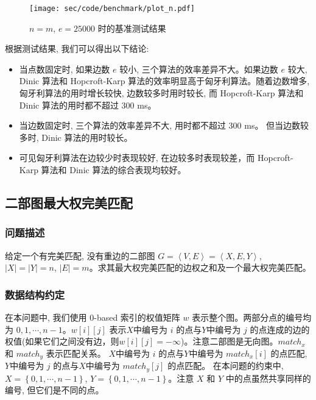 \begin{figure}[H]
	\centering
	\texttt{[image: sec/code/benchmark/plot\_n.pdf]}
	\caption{$n = m$, $e = 25000$ 时的基准测试结果}
	\label{fig:benchmark_n_plot}
\end{figure}

根据测试结果, 我们可以得出以下结论: 
\begin{itemize}
	\item 当点数固定时, 如果边数 $e$ 较小, 三个算法的效率差异不大。如果边数 $e$ 较大, Dinic 算法和 Hopcroft-Karp 算法的效率明显高于匈牙利算法。随着边数增多, 匈牙利算法的用时增长较快, 边数较多时用时较长, 而 Hopcroft-Karp 算法和 Dinic 算法的用时都不超过 300 ms。
	\item 当边数固定时, 三个算法的效率差异不大, 用时都不超过 300 ms。 但当边数较多时, Dinic 算法的用时较长。
	\item 可见匈牙利算法在边较少时表现较好, 在边较多时表现较差，而 Hopcroft-Karp 算法和 Dinic 算法的综合表现均较好。
\end{itemize}

\subsection{二部图最大权完美匹配}
\subsubsection{问题描述}
给定一个有完美匹配, 没有重边的二部图 $G = \left<V, E\right> = \left<X, E, Y\right>$, $\left|X\right| = \left|Y\right| = n$, $\left|E\right| = m$。求其最大权完美匹配的边权之和及一个最大权完美匹配。
\subsubsection{数据结构约定}
在本问题中, 我们使用 0-based 索引的权值矩阵 $w$ 表示整个图。两部分点的编号均为 $0, 1, \cdots, n - 1$。$w[i][j]$ 表示$X$中编号为 $i$ 的点与$Y$中编号为 $j$ 的点连成的边的权值(如果它们之间没有边，则$w[i][j] = -\infty$)。注意二部图是无向图。$match_x$ 和 $match_y$ 表示匹配关系。
$X$中编号为 $i$ 的点与$Y$中编号为 $match_x[i]$ 的点匹配, $Y$中编号为 $j$ 的点与$X$中编号为 $match_y[j]$ 的点匹配。
在本问题的约束中, $X = \left\{0, 1, \cdots, n - 1\right\}$, $Y = \left\{0, 1, \cdots, n - 1\right\}$。注意 $X$ 和 $Y$ 中的点虽然共享同样的编号, 但它们是不同的点。

